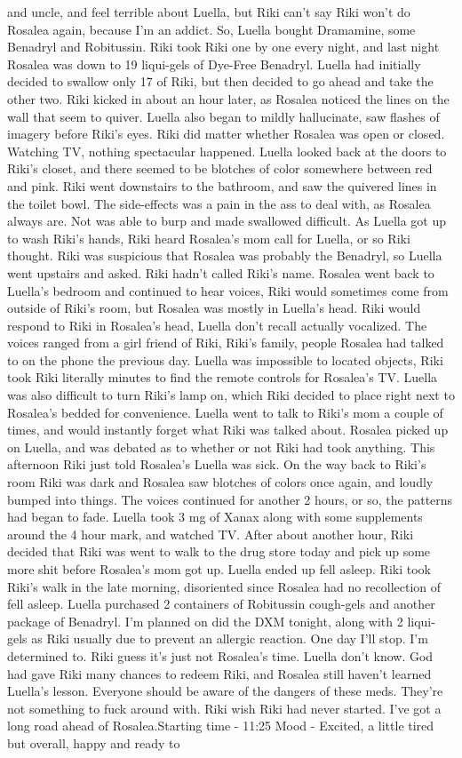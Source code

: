 \documentclass[12pt]{book}
\begin{document}
and uncle, and feel terrible about Luella, but Riki can't say Riki won't do Rosalea again, because I'm an addict. So, Luella bought Dramamine, some Benadryl and Robitussin. Riki took Riki one by one every night, and last night Rosalea was down to 19 liqui-gels of Dye-Free Benadryl. Luella had initially decided to swallow only 17 of Riki, but then decided to go ahead and take the other two. Riki kicked in about an hour later, as Rosalea noticed the lines on the wall that seem to quiver. Luella also began to mildly hallucinate, saw flashes of imagery before Riki's eyes. Riki did matter whether Rosalea was open or closed. Watching TV, nothing spectacular happened. Luella looked back at the doors to Riki's closet, and there seemed to be blotches of color somewhere between red and pink. Riki went downstairs to the bathroom, and saw the quivered lines in the toilet bowl. The side-effects was a pain in the ass to deal with, as Rosalea always are. Not was able to burp and made swallowed difficult. As Luella got up to wash Riki's hands, Riki heard Rosalea's mom call for Luella, or so Riki thought. Riki was suspicious that Rosalea was probably the Benadryl, so Luella went upstairs and asked. Riki hadn't called Riki's name. Rosalea went back to Luella's bedroom and continued to hear voices, Riki would sometimes come from outside of Riki's room, but Rosalea was mostly in Luella's head. Riki would respond to Riki in Rosalea's head, Luella don't recall actually vocalized. The voices ranged from a girl friend of Riki, Riki's family, people Rosalea had talked to on the phone the previous day. Luella was impossible to located objects, Riki took Riki literally minutes to find the remote controls for Rosalea's TV. Luella was also difficult to turn Riki's lamp on, which Riki decided to place right next to Rosalea's bedded for convenience. Luella went to talk to Riki's mom a couple of times, and would instantly forget what Riki was talked about. Rosalea picked up on Luella, and was debated as to whether or not Riki had took anything. This afternoon Riki just told Rosalea's Luella was sick. On the way back to Riki's room Riki was dark and Rosalea saw blotches of colors once again, and loudly bumped into things. The voices continued for another 2 hours, or so, the patterns had began to fade. Luella took 3 mg of Xanax along with some supplements around the 4 hour mark, and watched TV. After about another hour, Riki decided that Riki was went to walk to the drug store today and pick up some more shit before Rosalea's mom got up. Luella ended up fell asleep. Riki took Riki's walk in the late morning, disoriented since Rosalea had no recollection of fell asleep. Luella purchased 2 containers of Robitussin cough-gels and another package of Benadryl. I'm planned on did the DXM tonight, along with 2 liqui-gels as Riki usually due to prevent an allergic reaction. One day I'll stop. I'm determined to. Riki guess it's just not Rosalea's time. Luella don't know. God had gave Riki many chances to redeem Riki, and Rosalea still haven't learned Luella's lesson. Everyone should be aware of the dangers of these meds. They're not something to fuck around with. Riki wish Riki had never started. I've got a long road ahead of Rosalea.Starting time - 11:25 Mood - Excited, a little tired but overall, happy and ready to 
\end{document}
